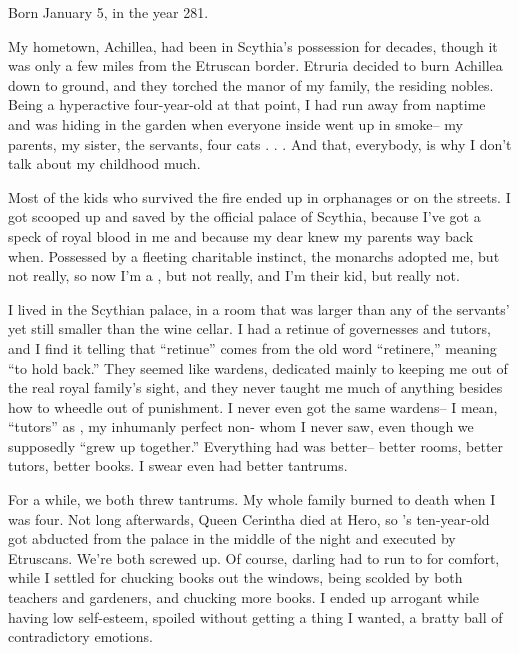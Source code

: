 \documentclass[char]{Kos}
\begin{document}
\name{\cWard{}}

Born January 5, in the year 281.

My hometown, Achillea, had been in Scythia's possession for decades, though it was only a few miles from the Etruscan border. Etruria decided to burn Achillea down to ground, and they torched the manor of my family, the residing nobles. Being a hyperactive four-year-old at that point, I had run away from naptime and was hiding in the garden when everyone inside went up in smoke-- my parents, my sister, the servants, four cats . . . And that, everybody, is why I don't talk about my childhood much.

Most of the kids who survived the fire ended up in orphanages or on the streets. I got scooped up and saved by the official palace of Scythia, because I've got a speck of royal blood in me and because my dear \cScythiaQueen{\Monarch} \cScythiaQueen{} knew my parents way back when. Possessed by a fleeting charitable instinct, the monarchs adopted me, but not really, so now I'm a \cWard{\prince}, but not really, and I'm their kid, but really not.

I lived in the Scythian palace, in a room that was larger than any of the servants' yet still smaller than the wine cellar. I had a retinue of governesses and tutors, and I find it telling that ``retinue'' comes from the old word ``retinere,'' meaning ``to hold back.'' They seemed like wardens, dedicated mainly to keeping me out of the real royal family's sight, and they never taught me much of anything besides how to wheedle out of punishment. I never even got the same wardens-- I mean, ``tutors'' as \cBride{}, my inhumanly perfect non-\cBride{\sibling} \cBride{\sibling} whom I never saw, even though we supposedly ``grew up together.'' Everything \cBride{} had was better-- better rooms, better tutors, better books. I swear \cBride{\they} even had better tantrums.

For a while, we both threw tantrums. My whole family burned to death when I was four. Not long afterwards, Queen Cerintha died at Hero, so \cBride{}'s ten-year-old \cFugitive{\sibling} \cFugitive{} got abducted from the palace in the middle of the night and executed by Etruscans. We're both screwed up. Of course, darling \cBride{} had \cBride{\their} \cScythiaKing{\parent} \cScythiaKing{} to run to for comfort, while I settled for chucking books out the windows, being scolded by both teachers and gardeners, and chucking more books. I ended up arrogant while having low self-esteem, spoiled without getting a thing I wanted, a bratty ball of contradictory emotions. 
\end{document}
